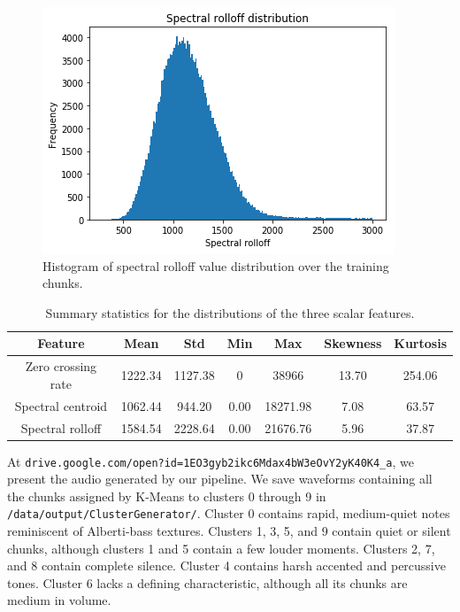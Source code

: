 \documentclass{article}
\begin{document}
\begin{figure}
    \centering
    \includegraphics[width=0.67 \linewidth]{spectral_rolloff_distribution.png}
    \caption{Histogram of spectral rolloff value distribution over the training chunks.}
    \label{fig:spectral_rolloff_distribution}
\end{figure}

\begin{table}
    \centering
    \begin{tabular}{ccccccc}
        \toprule
        Feature & Mean & Std & Min & Max & Skewness & Kurtosis \\
        \toprule
        Zero crossing rate & 1222.34 & 1127.38 & 0 & 38966 & 13.70 & 254.06 \\
        \midrule
        Spectral centroid & 1062.44 & 944.20 & 0.00 & 18271.98 & 7.08 & 63.57 \\
        \midrule
        Spectral rolloff & 1584.54 & 2228.64 & 0.00 & 21676.76 & 5.96 & 37.87 \\
        \bottomrule
    \end{tabular}
    \caption{Summary statistics for the distributions of the three scalar features.}
    \label{tab:feature_summary}
\end{table}

At \texttt{drive.google.com/open?id=1EO3gyb2ikc6Mdax4bW3eOvY2yK40K4\_a}, we present the audio generated by our pipeline. We save waveforms containing all the chunks assigned by K-Means to clusters 0 through 9 in \texttt{/data/output/ClusterGenerator/}. Cluster 0 contains rapid, medium-quiet notes reminiscent of Alberti-bass textures. Clusters 1, 3, 5, and 9 contain quiet or silent chunks, although clusters 1 and 5 contain a few louder moments. Clusters 2, 7, and 8 contain complete silence. Cluster 4 contains harsh accented and percussive tones. Cluster 6 lacks a defining characteristic, although all its chunks are medium in volume.
\end{document}
